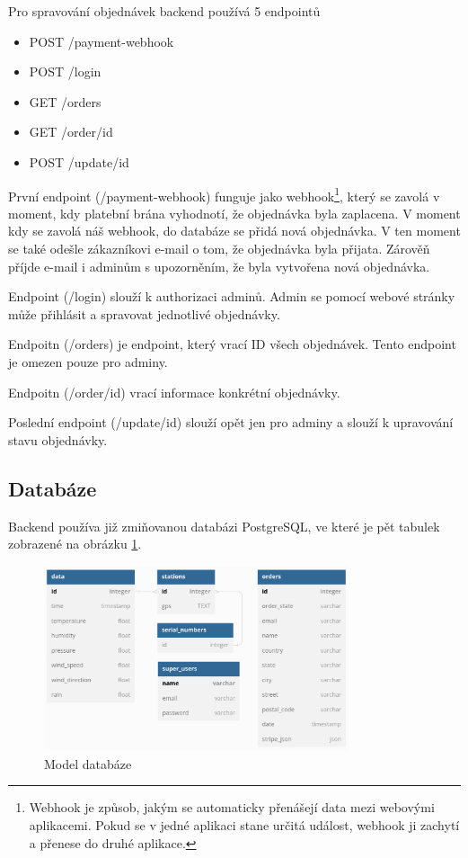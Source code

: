 Pro spravování objednávek backend používá 5 endpointů
\begin{itemize}
  \item POST /payment-webhook
  \item POST /login
  \item GET /orders
  \item GET /order/{id}
  \item POST /update/{id}
\end{itemize}
První endpoint (/payment-webhook) funguje jako webhook\footnote{Webhook je způsob, jakým se automaticky přenášejí data mezi webovými aplikacemi.
Pokud se v jedné aplikaci stane určitá událost, webhook ji zachytí a přenese do druhé aplikace.},
který se zavolá v moment, kdy platební brána vyhodnotí, že objednávka byla zaplacena. V moment kdy se zavolá náš webhook, do databáze se přidá nová objednávka. 
V ten moment se také odešle zákazníkovi e-mail o tom, že objednávka byla přijata. Zárověň příjde e-mail i adminům s upozorněním, že byla vytvořena nová objednávka.

Endpoint (/login) slouží k authorizaci adminů. Admin se pomocí webové stránky může přihlásit a spravovat jednotlivé objednávky.

Endpoitn (/orders) je endpoint, který vrací ID všech objednávek. Tento endpoint je omezen pouze pro adminy.

Endpoitn (/order/{id}) vrací informace konkrétní objednávky.

Poslední endpoint (/update/{id}) slouží opět jen pro adminy a slouží k upravování stavu objednávky.

\subsection{Databáze}
Backend používa již zmiňovanou databázi PostgreSQL, ve které je pět tabulek zobrazené na obrázku \ref{model_databaze}.
\begin{figure}[h] 
    \centering
    \includegraphics[width=0.8\textwidth]{images/database_diagram.png}
    \caption{Model databáze}
    \label{model_databaze}
\end{figure}
